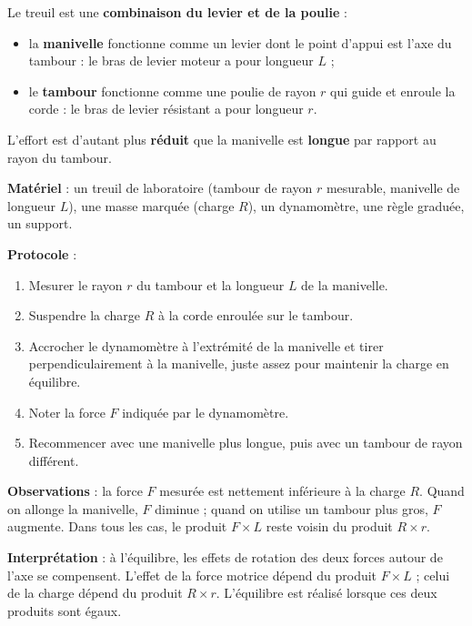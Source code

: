 \documentclass[11pt]{article}
\newcommand{\cle}[1]{{\popxbold\color{popdark}#1}}
\begin{document}
\begin{propriete}
Le treuil est une \textbf{combinaison du levier et de la poulie} :
\begin{itemize}
\item la \textbf{manivelle} fonctionne comme un \cle{levier} dont le point d'appui est l'axe du tambour : le bras de levier moteur a pour longueur $L$ ;
\item le \textbf{tambour} fonctionne comme une \cle{poulie} de rayon $r$ qui guide et enroule la corde : le bras de levier résistant a pour longueur $r$.
\end{itemize}
L'effort est d'autant plus \textbf{réduit} que la manivelle est \textbf{longue} par rapport au rayon du tambour.
\end{propriete}

\begin{experience}
\textbf{Matériel} : un treuil de laboratoire (tambour de rayon $r$ mesurable, manivelle de longueur $L$), une masse marquée (charge $R$), un dynamomètre, une règle graduée, un support.

\textbf{Protocole} :
\begin{enumerate}
\item Mesurer le rayon $r$ du tambour et la longueur $L$ de la manivelle.
\item Suspendre la charge $R$ à la corde enroulée sur le tambour.
\item Accrocher le dynamomètre à l'extrémité de la manivelle et tirer perpendiculairement à la manivelle, juste assez pour maintenir la charge en équilibre.
\item Noter la force $F$ indiquée par le dynamomètre.
\item Recommencer avec une manivelle plus longue, puis avec un tambour de rayon différent.
\end{enumerate}

\textbf{Observations} : la force $F$ mesurée est nettement inférieure à la charge $R$. Quand on allonge la manivelle, $F$ diminue ; quand on utilise un tambour plus gros, $F$ augmente. Dans tous les cas, le produit $F \times L$ reste voisin du produit $R \times r$.

\textbf{Interprétation} : à l'équilibre, les effets de rotation des deux forces autour de l'axe se compensent. L'effet de la force motrice dépend du produit $F \times L$ ; celui de la charge dépend du produit $R \times r$. L'équilibre est réalisé lorsque ces deux produits sont égaux.
\end{experience}
\end{document}
